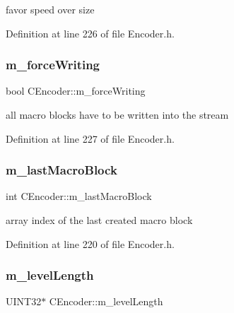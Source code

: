 favor speed over size 



Definition at line 226 of file Encoder.\+h.

\mbox{\label{classCEncoder_a52d2d5a49f3f6994f67cae1e2176f968}} 
\subsubsection{\texorpdfstring{m\_forceWriting}{m\_forceWriting}}
{\footnotesize\ttfamily bool C\+Encoder\+::m\+\_\+force\+Writing\hspace{0.3cm}{\ttfamily [private]}}



all macro blocks have to be written into the stream 



Definition at line 227 of file Encoder.\+h.

\mbox{\label{classCEncoder_aac446c96d95a90bb005019aef2d18284}} 
\subsubsection{\texorpdfstring{m\_lastMacroBlock}{m\_lastMacroBlock}}
{\footnotesize\ttfamily int C\+Encoder\+::m\+\_\+last\+Macro\+Block\hspace{0.3cm}{\ttfamily [private]}}



array index of the last created macro block 



Definition at line 220 of file Encoder.\+h.

\mbox{\label{classCEncoder_a6eba5be82f05684ca2574f36f8945717}} 
\subsubsection{\texorpdfstring{m\_levelLength}{m\_levelLength}}
{\footnotesize\ttfamily U\+I\+N\+T32$\ast$ C\+Encoder\+::m\+\_\+level\+Length\hspace{0.3cm}{\ttfamily [private]}}



